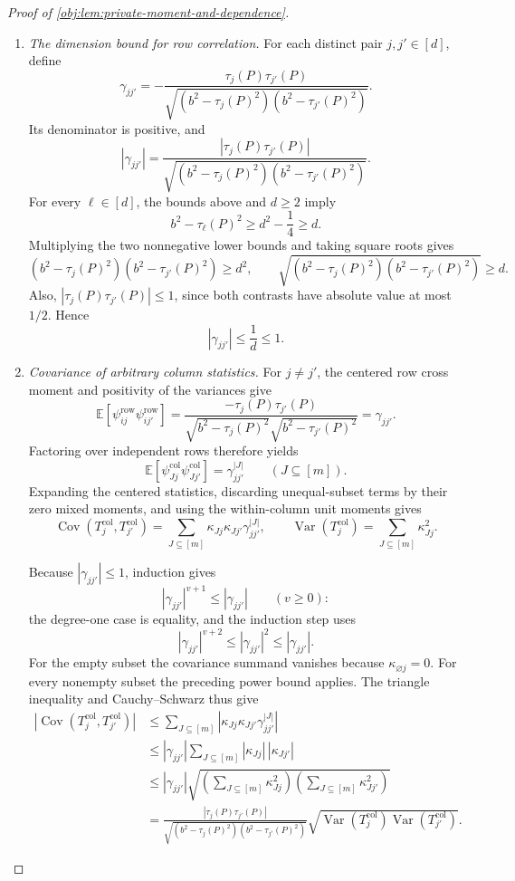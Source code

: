 \documentclass[11pt]{article}
\begin{document}
\begin{proof}[Proof of \cref{obj:lem:private-moment-and-dependence}]
\begin{enumerate}
\item \textit{The dimension bound for row correlation.}
For each distinct pair \(j,j'\in[d]\), define
\[
\gamma_{jj'}
=
-\frac{\tau_j(P)\tau_{j'}(P)}
{\sqrt{(b^2-\tau_j(P)^2)(b^2-\tau_{j'}(P)^2)}}.
\]
Its denominator is positive, and
\[
|\gamma_{jj'}|
=
\frac{|\tau_j(P)\tau_{j'}(P)|}
{\sqrt{(b^2-\tau_j(P)^2)(b^2-\tau_{j'}(P)^2)}}.
\]
For every \(\ell\in[d]\), the bounds above and \(d\ge2\) imply
\[
b^2-\tau_\ell(P)^2
\ge d^2-\frac14
\ge d.
\]
Multiplying the two nonnegative lower bounds and taking square roots gives
\[
(b^2-\tau_j(P)^2)(b^2-\tau_{j'}(P)^2)\ge d^2,
\qquad
\sqrt{(b^2-\tau_j(P)^2)(b^2-\tau_{j'}(P)^2)}\ge d.
\]
Also, \(|\tau_j(P)\tau_{j'}(P)|\le1\), since both contrasts have
absolute value at most \(1/2\). Hence
\[
|\gamma_{jj'}|
\le\frac1d
\le1.
\]

\item \textit{Covariance of arbitrary column statistics.}
For \(j\ne j'\), the centered row cross moment and positivity of the
variances give
\[
\mathbb E[
\psi^{\mathrm{row}}_{ij}\psi^{\mathrm{row}}_{ij'}]
=
\frac{-\tau_j(P)\tau_{j'}(P)}
{\sqrt{b^2-\tau_j(P)^2}\sqrt{b^2-\tau_{j'}(P)^2}}
=
\gamma_{jj'}.
\]
Factoring over independent rows therefore yields
\[
\mathbb E[
\psi^{\mathrm{col}}_{Jj}\psi^{\mathrm{col}}_{Jj'}]
=
\gamma_{jj'}^{|J|}
\qquad(J\subseteq[m]).
\]
Expanding the centered statistics, discarding unequal-subset terms by
their zero mixed moments, and using the within-column unit moments gives
\[
\operatorname{Cov}(T_j^{\mathrm{col}},T_{j'}^{\mathrm{col}})
=
\sum_{J\subseteq[m]}
\kappa_{Jj}\kappa_{Jj'}\gamma_{jj'}^{|J|},
\qquad
\operatorname{Var}(T_j^{\mathrm{col}})
=
\sum_{J\subseteq[m]}\kappa_{Jj}^2.
\]

Because \(|\gamma_{jj'}|\le1\), induction gives
\[
|\gamma_{jj'}|^{v+1}\le|\gamma_{jj'}|
\qquad(v\ge0):
\]
the degree-one case is equality, and the induction step uses
\[
|\gamma_{jj'}|^{v+2}
\le|\gamma_{jj'}|^2
\le|\gamma_{jj'}|.
\]
For the empty subset the covariance summand vanishes because
\(\kappa_{\varnothing j}=0\). For every nonempty subset the preceding
power bound applies. The triangle inequality and Cauchy--Schwarz thus give
\[
\begin{aligned}
\left|
\operatorname{Cov}(T_j^{\mathrm{col}},T_{j'}^{\mathrm{col}})
\right|
&\le
\sum_{J\subseteq[m]}
\left|\kappa_{Jj}\kappa_{Jj'}\gamma_{jj'}^{|J|}\right|\\
&\le
|\gamma_{jj'}|
\sum_{J\subseteq[m]}|\kappa_{Jj}|\,|\kappa_{Jj'}|\\
&\le
|\gamma_{jj'}|
\sqrt{\left(\sum_{J\subseteq[m]}\kappa_{Jj}^2\right)
      \left(\sum_{J\subseteq[m]}\kappa_{Jj'}^2\right)}\\
&=
\frac{|\tau_j(P)\tau_{j'}(P)|}
{\sqrt{(b^2-\tau_j(P)^2)(b^2-\tau_{j'}(P)^2)}}
\sqrt{\operatorname{Var}(T_j^{\mathrm{col}})
      \operatorname{Var}(T_{j'}^{\mathrm{col}})}.
\end{aligned}
\]


\end{enumerate}
\end{proof}
\end{document}
